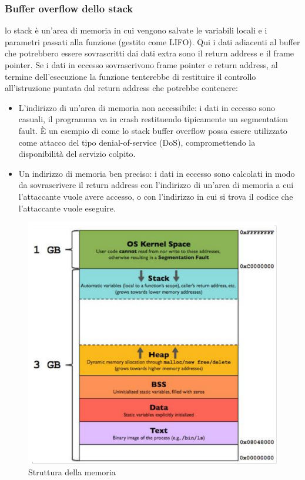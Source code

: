 \documentclass[8pt]{extarticle}
\begin{document}
\subsubsection{Buffer overflow dello stack}
lo stack è un’area di memoria in cui vengono salvate le variabili locali e i parametri passati alla funzione 
(gestito come LIFO). Qui i dati adiacenti al buffer che potrebbero essere sovrascritti dai dati extra sono 
il return address e il frame pointer. Se i dati in eccesso sovrascrivono frame pointer e return address, 
al termine dell’esecuzione la funzione tenterebbe di restituire il controllo all’istruzione puntata dal 
return address che potrebbe contenere:
\begin{itemize}
    \item L’indirizzo di un’area di memoria non accessibile: i dati in eccesso sono casuali, il programma 
    va in crash restituendo tipicamente un segmentation fault. È un esempio di come lo stack buffer 
    overflow possa essere utilizzato come attacco del tipo denial-of-service (DoS), compromettendo la 
    disponibilità del servizio colpito.
    \item Un indirizzo di memoria ben preciso: i dati in eccesso sono calcolati in modo da sovrascrivere 
    il return address con l’indirizzo di un’area di memoria a cui l’attaccante vuole avere accesso, o con 
    l’indirizzo in cui si trova il codice che l’attaccante vuole eseguire.
\end{itemize}
\begin{figure}[H]
    \center
    \includegraphics[scale=0.2]{images/BO2.png}
    \caption{Struttura della memoria}\label{fig:1}
\end{figure}
\end{document}
